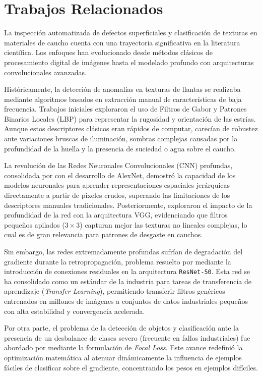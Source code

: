 \section{Trabajos Relacionados}
La inspección automatizada de defectos superficiales y clasificación de texturas en materiales de caucho cuenta con una trayectoria significativa en la literatura científica. Los enfoques han evolucionado desde métodos clásicos de procesamiento digital de imágenes hasta el modelado profundo con arquitecturas convolucionales avanzadas.

Históricamente, la detección de anomalías en texturas de llantas se realizaba mediante algoritmos basados en extracción manual de características de baja frecuencia. Trabajos iniciales exploraron el uso de Filtros de Gabor y Patrones Binarios Locales (LBP) para representar la rugosidad y orientación de las estrías. Aunque estos descriptores clásicos eran rápidos de computar, carecían de robustez ante variaciones bruscas de iluminación, sombras complejas causadas por la profundidad de la huella y la presencia de suciedad o agua sobre el caucho.

La revolución de las Redes Neuronales Convolucionales (CNN) profundas, consolidada por \citet{krizhevsky2012imagenet} con el desarrollo de AlexNet, demostró la capacidad de los modelos neuronales para aprender representaciones espaciales jerárquicas directamente a partir de pixeles crudos, superando las limitaciones de los descriptores manuales tradicionales. Posteriormente, \citet{simonyan2014very} exploraron el impacto de la profundidad de la red con la arquitectura VGG, evidenciando que filtros pequeños apilados ($3 \times 3$) capturan mejor las texturas no lineales complejas, lo cual es de gran relevancia para patrones de desgaste en cauchos.

Sin embargo, las redes extremadamente profundas sufrían de degradación del gradiente durante la retropropagación, problema resuelto por \citet{he2016deep} mediante la introducción de conexiones residuales en la arquitectura \texttt{ResNet-50}. Esta red se ha consolidado como un estándar de la industria para tareas de transferencia de aprendizaje (\textit{Transfer Learning}), permitiendo transferir filtros genéricos entrenados en millones de imágenes a conjuntos de datos industriales pequeños con alta estabilidad y convergencia acelerada.

Por otra parte, el problema de la detección de objetos y clasificación ante la presencia de un desbalance de clases severo (frecuente en fallos industriales) fue abordado por \citet{lin2017focal} mediante la formulación de \textit{Focal Loss}. Este avance redefinió la optimización matemática al atenuar dinámicamente la influencia de ejemplos fáciles de clasificar sobre el gradiente, concentrando los pesos en ejemplos difíciles. 

